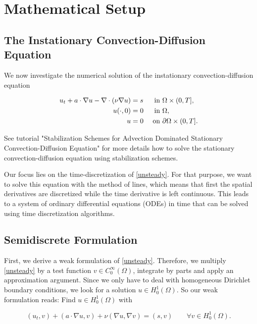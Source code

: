 \documentclass[a4paper, 11pt, twoside]{article}
\begin{document}
\section{Mathematical Setup}
\subsection{The Instationary Convection-Diffusion Equation}\label{sectionequation}
We now investigate the numerical solution of the instationary convection-diffusion equation

	\begin{align}\label{unsteady}
		u_{t} + a \cdot \nabla u - \nabla \cdot (\nu\nabla u) &= s &\text{ in } &\Omega \times (0, T], \\
		\notag u(\cdot, 0) &= 0 &\text{ in } &\Omega, \\
		\notag u &= 0 &\text{ on } &\partial\Omega \times (0, T].
	\end{align}

See tutorial "Stabilization Schemes for Advection Dominated Stationary Convection-Diffusion Equation" for more details how to solve the stationary convection-diffusion equation using stabilization schemes.

Our focus lies on the time-discretization of \eqref{unsteady}. For that purpose, we want to solve this equation with the method of lines, which means that first the spatial derivatives are discretized while the time derivative is left continuous. This leads to a system of ordinary differential equations (ODEs) in time that can be solved using time discretization algorithms.

\subsection{Semidiscrete Formulation}

First, we derive a weak formulation of \eqref{unsteady}. Therefore, we multiply \eqref{unsteady} by a test function $v \in C_{0}^{\infty}(\Omega)$, integrate by parts and apply an approximation argument. Since we only have to deal with homogeneous Dirichlet boundary conditions, we look for a solution $u \in H^{1}_{0}(\Omega)$. So our weak formulation reads: Find $u \in H^{1}_{0}(\Omega)$ with

	\begin{equation}\label{unsteady_weak}
		(u_{t}, v) + (a \cdot \nabla u, v) + \nu(\nabla u, \nabla v) = (s, v) \qquad \forall v \in H^{1}_{0}(\Omega).
	\end{equation}
\end{document}
